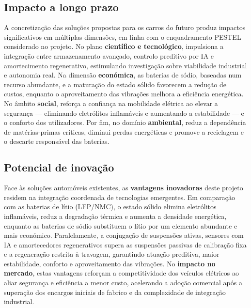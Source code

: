 
\subsection{Impacto a longo prazo}
\begin{campotexto}
A concretização das soluções propostas para os carros do futuro produz impactos significativos em múltiplas dimensões, em linha com o enquadramento PESTEL considerado no projeto. No plano \textbf{científico e tecnológico}, impulsiona a integração entre armazenamento avançado, controlo preditivo por IA e amortecimento regenerativo, estimulando investigação sobre viabilidade industrial e autonomia real. Na dimensão \textbf{económica}, as baterias de sódio, baseadas num recurso abundante, e a maturação do estado sólido favorecem a redução de custos, enquanto o aproveitamento das vibrações melhora a eficiência energética. No âmbito \textbf{social}, reforça a confiança na mobilidade elétrica ao elevar a segurança --- eliminando eletrólitos inflamáveis e aumentando a estabilidade --- e o conforto dos utilizadores. Por fim, no domínio \textbf{ambiental}, reduz a dependência de matérias-primas críticas, diminui perdas energéticas e promove a reciclagem e o descarte responsável das baterias.
\end{campotexto}

\subsection{Potencial de inovação}
\begin{campotexto}
Face às soluções automóveis existentes, as \textbf{vantagens inovadoras} deste projeto residem na integração coordenada de tecnologias emergentes. Em comparação com as baterias de lítio (LFP/NMC), o estado sólido elimina eletrólitos inflamáveis, reduz a degradação térmica e aumenta a densidade energética, enquanto as baterias de sódio substituem o lítio por um elemento abundante e mais económico. Paralelamente, a conjugação de suspensões ativas, sensores com IA e amortecedores regenerativos supera as suspensões passivas de calibração fixa e a regeneração restrita à travagem, garantindo atuação preditiva, maior estabilidade, conforto e aproveitamento das vibrações.
No \textbf{impacto no mercado}, estas vantagens reforçam a competitividade dos veículos elétricos ao aliar segurança e eficiência a menor custo, acelerando a adoção comercial após a superação dos encargos iniciais de fabrico e da complexidade de integração industrial.
\end{campotexto}

